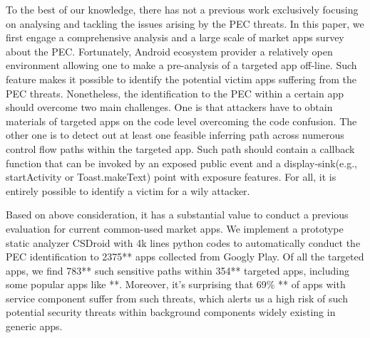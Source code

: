 To the best of our knowledge, there has not a previous work exclusively focusing on analysing and tackling the issues arising by the PEC threats. In this paper, we first engage a comprehensive analysis and a large scale of market apps survey about the PEC. Fortunately, Android ecosystem provider a relatively open environment allowing one to make a pre-analysis of a targeted app off-line. Such feature makes it possible to identify the potential victim apps suffering from the PEC threats. Nonetheless, the identification to the PEC within a certain app should overcome two main challenges. One is that attackers have to obtain materials of targeted apps on the code level overcoming the code confusion. The other one is to detect out at least one feasible inferring path across numerous control flow paths within the targeted app. Such path should contain a callback function that can be invoked by an exposed public event and a display-sink(e.g., startActivity or Toast.makeText) point with exposure features. For all, it is entirely possible to identify a victim for a wily attacker. 


Based on above consideration, it has a substantial value to conduct a previous evaluation for current common-used market apps. We implement a prototype static analyzer CSDroid with 4k lines python codes to automatically conduct the PEC identification to 2375** apps collected from Googly Play. Of all the targeted apps, we find 783** such sensitive paths within 354** targeted apps, including some popular apps like **. Moreover, it's surprising that 69\% **  of apps with service component suffer from such threats, which alerts us a high risk of such potential security threats within background components widely existing in generic apps.  


